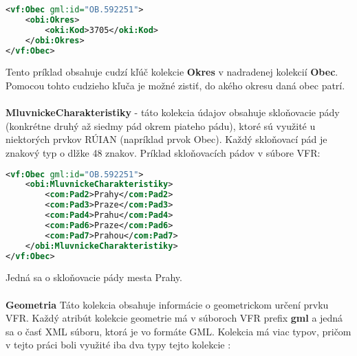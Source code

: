 \begin{lstlisting}[language=XML]
<vf:Obec gml:id="OB.592251">
    <obi:Okres>
        <oki:Kod>3705</oki:Kod>
    </obi:Okres>
</vf:Obec>
 \end{lstlisting}
Tento príklad obsahuje cudzí kľúč kolekcie {\bf Okres} v nadradenej kolekcií {\bf Obec}. Pomocou tohto cudzieho kľuča je možné zistiť, do akého okresu daná obec patrí. \\ \\
{\bf MluvnickeCharakteristiky} - táto kolekcia údajov obsahuje skloňovacie pády (konkrétne druhý až siedmy pád okrem piateho pádu), ktoré sú využité u niektorých prvkov RÚIAN (napríklad prvok Obec). Každý skloňovací pád je znakový typ o dlžke 48 znakov. Príklad skloňovacích pádov v súbore VFR:
\begin{lstlisting}[language=XML]
<vf:Obec gml:id="OB.592251">
    <obi:MluvnickeCharakteristiky>
        <com:Pad2>Prahy</com:Pad2>
        <com:Pad3>Praze</com:Pad3>
        <com:Pad4>Prahu</com:Pad4>
        <com:Pad6>Praze</com:Pad6>
        <com:Pad7>Prahou</com:Pad7>
    </obi:MluvnickeCharakteristiky>
</vf:Obec>
\end{lstlisting}
Jedná sa o skloňovacie pády mesta Prahy. \\ \\
{\bf Geometria}
Táto kolekcia obsahuje informácie o geometrickom určení prvku VFR. Každý atribút kolekcie geometrie má v súboroch VFR prefix {\bf gml} a jedná sa o časť  XML súboru, ktorá je vo formáte GML. Kolekcia má viac typov, pričom v tejto práci boli využité iba dva typy tejto kolekcie : 
